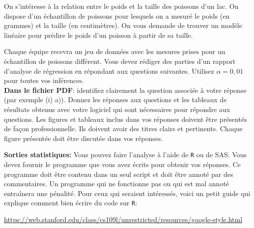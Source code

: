 \begin{questions}

\newpage

\question\label{prog}
On s'intéresse à la relation entre le poids et la taille des poissons d'un lac. On dispose d'un échantillon de poissons pour lesquels on a mesuré le poids (en grammes) et la taille (en centimètres).
On vous demande de trouver un modèle linéaire pour prédire le poids d'un poisson à partir de sa taille.

Chaque équipe recevra un jeu de données avec les mesures prises pour un échantillon de poissons différent.
Vous devez rédiger des parties d'un rapport d'analyse de régression en répondant aux questions suivantes. Utilisez $\alpha = 0,01$ pour toutes vos inférences.\\ 


{\bf Dans le fichier PDF}: identifiez clairement la question associée à votre réponse (par exemple (i) a)). Donnez les réponses aux questions et les tableaux de résultats obtenus avec votre logiciel qui sont nécessaires pour
répondre aux questions. Les figures et tableaux inclus dans vos réponses doivent être présentés de façon professionnelle. Ils doivent avoir des titres clairs et pertinents. Chaque figure présentée doit être discutée dans vos réponses. 

\textbf{Sorties statistiques:}
Vous pouvez faire l'analyse à l'aide de \texttt{R} ou de SAS. 
Vous devez fournir le programme que vous avez écrits pour obtenir vos réponses.
Ce programme doit être contenu dans un seul script et doit être annoté par des commentaires.
Un programme qui ne fonctionne pas ou qui est mal annoté entraînera une pénalité.
Pour ceux qui seraient intéressés, voici un petit guide qui explique comment bien écrire du code sur \texttt{R}: 

\href{https://web.stanford.edu/class/cs109l/unrestricted/resources/google-style.html}{https://web.stanford.edu/class/cs109l/unrestricted/resources/google-style.html}\\


\begin{parts}

\end{parts}
\end{questions}

